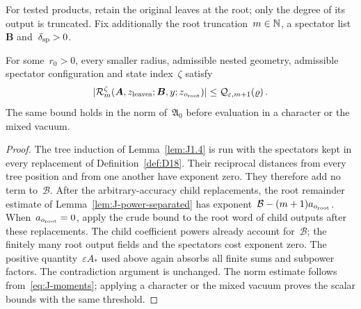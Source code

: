 For tested products, retain the original leaves at the root; only the degree of its output is truncated. Fix additionally the root truncation~$m\in\mathbb{N}$, a spectator list~$\boldsymbol B$ and~$\delta_{\rm sp}>0$.

\begin{lemma}\label{lem:J1.5}
For some~$r_0>0$, every smaller radius, admissible nested geometry, admissible spectator configuration and state index~$\zeta$ satisfy
\begin{equation*}
|\mathcal R_m^\zeta(\boldsymbol A,z_{\rm leaves};\boldsymbol B,y;z_{o_{\rm root}})|
\le\mathcal Q_{\varepsilon,m+1}(\varrho)\,.
\end{equation*}
The same bound holds in the norm of~$\mathfrak A_0$ before evaluation in a character or the mixed vacuum.
\end{lemma}

\begin{proof}
The tree induction of Lemma~\ref{lem:J1.4} is run with the spectators kept in every replacement of Definition~\ref{def:D18}. Their reciprocal distances from every tree position and from one another have exponent zero. They therefore add no term to~$\mathcal B$. After the arbitrary-accuracy child replacements, the root remainder estimate of Lemma~\ref{lem:J-power-separated} has exponent~$\mathcal B-(m+1)a_{o_{\rm root}}$. When~$a_{o_{\rm root}}=0$, apply the crude bound to the root word of child outputs after these replacements. The child coefficient powers already account for~$\mathcal B$; the finitely many root output fields and the spectators cost exponent zero. The positive quantity~$\varepsilon A_*$ used above again absorbs all finite sums and subpower factors. The contradiction argument is unchanged. The norm estimate follows from~\eqref{eq:J-moments}; applying a character or the mixed vacuum proves the scalar bounds with the same threshold.
\end{proof}

